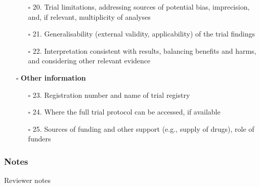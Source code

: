 \documentclass[11pt]{article}
\def\tightlist{}
\begin{document}
\begin{Form}
\begin{itemize}
  \begin{itemize}
  \tightlist
  \item[$\square$]
    20. Trial limitations, addressing sources of potential bias,
    imprecision, and, if relevant, multiplicity of analyses
  \item[$\square$]
    21. Generalisability (external validity, applicability) of the trial
    findings
  \item[$\square$]
    22. Interpretation consistent with results, balancing benefits and
    harms, and considering other relevant evidence
  \end{itemize}
\item[$\square$]
  \textbf{Other information}

  \begin{itemize}
  \tightlist
  \item[$\square$]
    23. Registration number and name of trial registry
  \item[$\square$]
    24. Where the full trial protocol can be accessed, if available
  \item[$\square$]
    25. Sources of funding and other support (e.g., supply of drugs),
    role of funders
  \end{itemize}
\end{itemize}

\subsubsection{Notes}\label{notes}

{Reviewer notes}

\end{Form}
\end{document}
